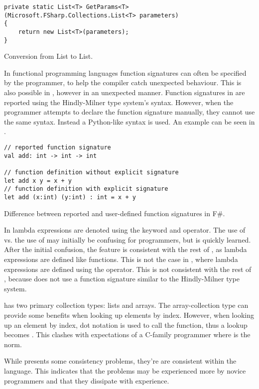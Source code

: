 \begin{listing}[H]
\begin{verbatim}
private static List<T> GetParams<T> (Microsoft.FSharp.Collections.List<T> parameters)
{
    return new List<T>(parameters);
}
\end{verbatim}
\caption{Conversion from \fs List to \cs List.}
\label{lst:list-conv}
\end{listing}

In functional programming languages function signatures can often be specified by the programmer, to help the compiler catch unexpected behaviour. This is also possible in \fs, however in an unexpected manner. Function signatures in \fs are reported using the Hindly-Milner type system's syntax\cite{fsharp:type:inference}. However, when the programmer attempts to declare the function signature manually, they cannot use the same syntax. Instead a Python-like syntax is used. An example can be seen in .

\begin{listing}[H]
\begin{verbatim}
// reported function signature
val add: int -> int -> int

// function definition without explicit signature
let add x y = x + y
// function definition with explicit signature
let add (x:int) (y:int) : int = x + y
\end{verbatim}
\caption{Difference between reported and user-defined function signatures in F\#.}
\label{lst:fun-sig}
\end{listing}

In \fs lambda expressions are denoted using the  keyword and \ttt{-\textgreater} operator. The use of  vs. the use of  may initially be confusing for programmers, but is quickly learned. After the initial confusion, the feature is consistent with the rest of \fs, as lambda expressions are defined like functions. This is not the case in \cs, where lambda expressions are defined using the \ttt{=\textgreater} operator. This is not consistent with the rest of \cs, because \cs does not use a function signature similar to the Hindly-Milner type system.

\fs has two primary collection types: lists and arrays. The array-collection type can provide some benefits when looking up elements by index.  However, when looking up an element by index, dot notation is used to call the \ttt{[]} function, thus a lookup becomes . This clashes with expectations of a C-family programmer where  is the norm.

While \fs presents some consistency problems, they're are consistent within the language. This indicates that the problems may be experienced more by novice programmers and that they dissipate with experience.
